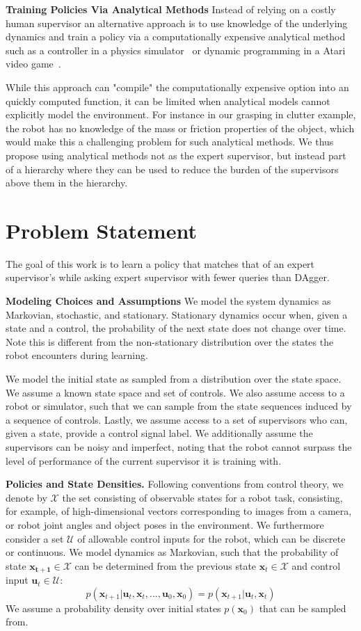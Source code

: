 \documentclass[10pt, conference]{ieeeconf}      %
\newcommand{\bu}{\mathbf{u}}
\newcommand{\bx}{\mathbf{x}}
\begin{document}
\noindent\textbf{Training Policies Via Analytical Methods} Instead of relying on a costly human supervisor an alternative approach is to use knowledge of the underlying dynamics and train a policy via a computationally expensive analytical method such as a controller in a physics simulator~\cite{IGOR} or dynamic programming in a Atari video game~\cite{NIPS2014_5421}. 

While this approach can "compile" the computationally expensive option into an quickly computed function, it can be limited when analytical models cannot explicitly model the environment. For instance in our grasping in clutter example, the robot has no knowledge of the mass or friction properties of the object, which would make this a challenging problem for such analytical methods. We thus propose using analytical methods not as the expert supervisor, but instead part of a hierarchy where they can be used to reduce the burden of the supervisors above them in the hierarchy. 

\section{Problem Statement}
The goal of this work is to learn a policy that matches that of an expert supervisor's while asking expert supervisor with fewer queries than DAgger. 


\noindent\textbf{Modeling Choices and Assumptions}  We model the system dynamics as Markovian, stochastic, and stationary. Stationary dynamics occur when, given a state and a control, the probability of the next state does not change over time. Note this is different from the non-stationary distribution over the states the robot encounters during learning. 

We model the initial state as sampled from a distribution over the state space.
We assume a known state space and set of controls. We also assume access to a robot or simulator, such that we  can sample from the state sequences induced by a sequence of controls.   Lastly, we assume access to a set of supervisors who can, given a state, provide a control signal label. We additionally assume the supervisors can be noisy and imperfect, noting that the robot cannot surpass the level of performance of the current supervisor it is training with.

\noindent\textbf{Policies and State Densities.}
Following conventions from control theory, we denote by $\mathcal{X}$ the set consisting of observable states for a robot task, consisting, for example, of 
high-dimensional vectors corresponding to images from a camera, or robot joint angles and object poses in the environment.
We furthermore consider a set $\mathcal{U}$ of allowable control inputs for the robot, which can be discrete or
continuous. We model dynamics as Markovian, such that the probability of state $\mathbf{x_{t+1}}\in
\mathcal{X}$ can be determined from the previous state $\mathbf{x}_t\in\mathcal{X}$ and control input $\mathbf{u}_t\in
\mathcal{U}$: 
$$p(\bx_{t+1}|\bu_{t},\bx_{t}, \ldots, \bu_{0}, \bx_{0})=p(\bx_{t+1}|\bu_{t}, \bx_t)$$
We assume a probability density over initial states $p(\bx_0)$ that can be sampled from.
\end{document}
